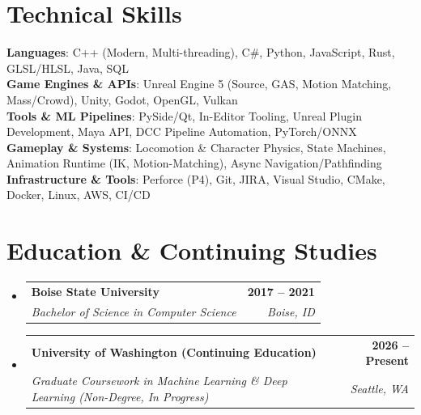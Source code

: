 \documentclass[letterpaper,11pt]{article}
\makeatletter
\newcommand{\resumeSubheading}[4]{
  \vspace{-2pt}\item
    \begin{tabular*}{1.0\textwidth}[t]{l@{\extracolsep{\fill}}r}
      \textbf{#1} & \textbf{\small #2} \\
      \textit{\small#3} & \textit{\small #4} \\
    \end{tabular*}\vspace{-7pt}
}
\newcommand{\resumeSubHeadingListStart}{\begin{itemize}[leftmargin=0.0in, label={}]}
\newcommand{\resumeSubHeadingListEnd}{\end{itemize}}
\makeatother
\begin{document}
\section{Technical Skills}
 \begin{itemize}[leftmargin=0.15in, label={}]
    \small{\item{
     \textbf{Languages}{: C++ (Modern, Multi-threading), C\#, Python, JavaScript, Rust, GLSL/HLSL, Java, SQL} \\
     \textbf{Game Engines \& APIs}{: Unreal Engine 5 (Source, GAS, Motion Matching, Mass/Crowd), Unity, Godot, OpenGL, Vulkan} \\
     \textbf{Tools \& ML Pipelines}{: PySide/Qt, In-Editor Tooling, Unreal Plugin Development, Maya API, DCC Pipeline Automation, PyTorch/ONNX} \\
     \textbf{Gameplay \& Systems}{: Locomotion \& Character Physics, State Machines, Animation Runtime (IK, Motion-Matching), Async Navigation/Pathfinding} \\
     \textbf{Infrastructure \& Tools}{: Perforce (P4), Git, JIRA, Visual Studio, CMake, Docker, Linux, AWS, CI/CD}
    }}
 \end{itemize}
 \vspace{-12pt}

\section{Education \& Continuing Studies}
  \resumeSubHeadingListStart
    \resumeSubheading
      {Boise State University}{2017 -- 2021}
      {Bachelor of Science in Computer Science}{Boise, ID}
    \resumeSubheading
      {University of Washington (Continuing Education)}{2026 -- Present}
      {Graduate Coursework in Machine Learning \& Deep Learning (Non-Degree, In Progress)}{Seattle, WA}
  \resumeSubHeadingListEnd
\end{document}
